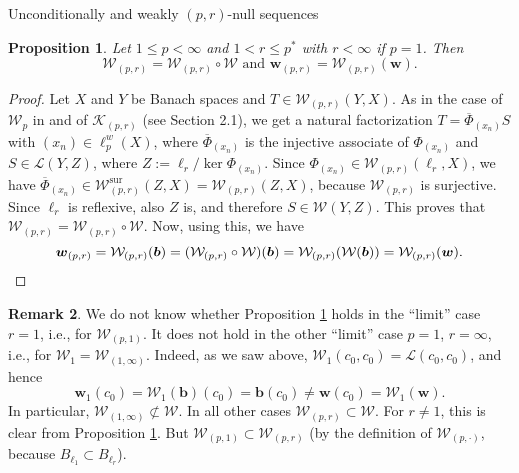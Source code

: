 \documentclass[a4paper,11pt]{amsart}
\newtheorem{prop}{Proposition}[section]
\theoremstyle{definition}
\newtheorem{rem}[prop]{Remark}
\theoremstyle{definition}
\theoremstyle{definition}
\begin{document}
\begin{section}{Unconditionally and weakly ${{(p,r)}}$-null sequences}
\begin{prop}\label{prop4.5}
Let $1\leq p < \infty$ and $1 < r \leq {p^{\ast}}$ with $r< \infty$ if $p=1$. Then 
\[
{{\mathcal W}}_{{(p,r)}} = {{\mathcal W}}_{{(p,r)}} \circ {{\mathcal W}} \text{ and } {\boldsymbol{w}}_{{(p,r)}} ={{\mathcal W}}_{{(p,r)}} ({\boldsymbol{w}}).
\]
\end{prop}

\begin{proof}
Let $X$ and $Y$ be Banach spaces and $T \in {{\mathcal W}}_{{(p,r)}}(Y,X)$. As in  the case of ${{\mathcal W}}_p$ in \cite[pp.~20--21]{SK1} and of ${{\mathcal K}}_{{(p,r)}}$ (see Section 2.1), we get a natural factorization $T=\overline \Phi _{(x_n)} S$ with $(x_n)\in \ell_p^w(X)$, where $\overline \Phi_{(x_n)}$ is the injective associate of $\Phi_{(x_n)}$ and $S \in {{\mathcal L}}(Y,Z)$, where $Z:= \ell_r / \ker \Phi_{(x_n)}$. Since $\Phi_{(x_n)} \in {{\mathcal W}}_{{(p,r)}} (\ell_r, X)$, we have $\overline \Phi _{(x_n)}\in {{\mathcal W}}_{{(p,r)}} ^\mathrm{sur}(Z,X) = {{\mathcal W}}_{{(p,r)}} (Z,X)$, because ${{\mathcal W}}_{{(p,r)}}$ is surjective. Since $\ell_r$ is reflexive, also $Z$ is, and therefore $S \in {{\mathcal W}}(Y,Z)$. This proves that ${{\mathcal W}}_{{(p,r)}} ={{\mathcal W}}_{{(p,r)}} \circ {{\mathcal W}}$. Now, using this, we have
\[
{\boldsymbol{w}}_{{(p,r)}} = {{\mathcal W}}_{{(p,r)}} ({\boldsymbol{b}})= ({{\mathcal W}}_{{(p,r)}} \circ {{\mathcal W}})({\boldsymbol{b}})= {{\mathcal W}}_{{(p,r)}} ({{\mathcal W}} ({\boldsymbol{b}}))={{\mathcal W}}_{{(p,r)}} ({\boldsymbol{w}}). \qedhere
\]
\end{proof}

\begin{rem}\label{rem4.6}
We do not know whether Proposition \ref{prop4.5} holds in the ``limit'' case $r=1$, i.e., for ${{\mathcal W}}_{(p,1)}$. It does not hold in the other ``limit'' case $p=1$, $r=\infty$, i.e., for ${{\mathcal W}}_1= {{\mathcal W}}_{(1, \infty)}$. Indeed, as we saw above, ${{\mathcal W}}_1(c_0, c_0)= {{\mathcal L}}(c_0, c_0)$, and hence 
\[
{\boldsymbol{w}} _1(c_0)= {{\mathcal W}}_1 ({\boldsymbol{b}})(c_0)= {\boldsymbol{b}} (c_0) \neq {\boldsymbol{w}} (c_0)= {{\mathcal W}}_1({\boldsymbol{w}}).
\]
In particular, ${{\mathcal W}}_{(1,\infty)} \not \subset {{\mathcal W}}$. In all other cases ${{\mathcal W}}_{{(p,r)}} \subset {{\mathcal W}}$. For $r\neq 1$, this is clear from Proposition \ref{prop4.5}. But ${{\mathcal W}}_{(p,1)} \subset {{\mathcal W}}_{{(p,r)}}$ (by the definition of ${{\mathcal W}}_{(p,\cdot)}$, because $B_{\ell_1}\subset B_{\ell_r}$).
\end{rem}


\end{section}
\end{document}

